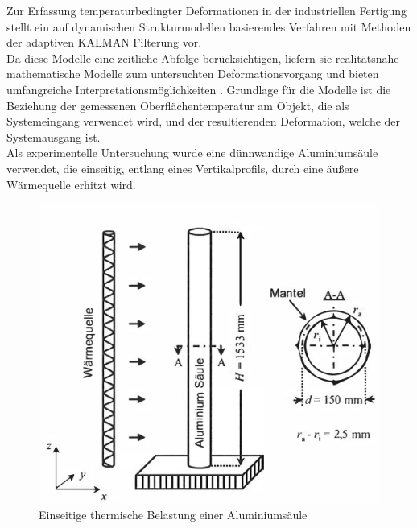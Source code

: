 Zur Erfassung temperaturbedingter Deformationen in der industriellen Fertigung stellt \cite{Eichhorn2005} ein auf dynamischen Strukturmodellen basierendes Verfahren mit Methoden der adaptiven KALMAN Filterung vor.\\
Da diese Modelle eine zeitliche Abfolge berücksichtigen, liefern sie realitätsnahe mathematische Modelle zum untersuchten Deformationsvorgang und bieten umfangreiche  Interpretationsmöglichkeiten \cite{Eichhorn2005}. Grundlage für die Modelle ist die Beziehung der gemessenen Oberflächentemperatur am Objekt, die als Systemeingang verwendet wird, und der resultierenden Deformation, welche der Systemausgang ist.\\
Als experimentelle Untersuchung wurde eine dünnwandige Aluminiumsäule verwendet, die einseitig, entlang eines Vertikalprofils, durch eine äußere Wärmequelle erhitzt wird. 
\newpage
\begin{figure}[h]
	\label{fig:stahlsaeule}
	\centering
		\includegraphics[scale=1.5]{bilder/erwaermungStahlsaeule}
	\caption[Einseitige thermische Belastung einer Aluminiumsäule]{Einseitige thermische Belastung einer Aluminiumsäule \protect\footnotemark}
\end{figure}

